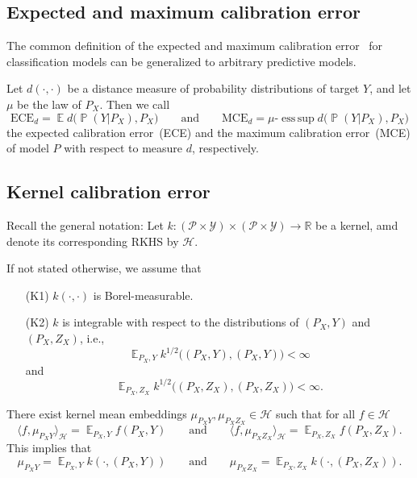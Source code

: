 \documentclass{article}
\DeclareMathOperator{\Prob}{\mathbb{P}}
\DeclareMathOperator{\Exp}{\mathbb{E}}
\DeclareMathOperator*{\esssup}{ess\,sup}
\begin{document}
\subsection{Expected and maximum calibration error}
\label{app:ece_mce}

The common definition of the expected and maximum calibration error~\citep{Naeini2015,Guo2017,Vaicenavicius2019,Kull2019}
for classification models can be generalized to arbitrary predictive
models.

\begin{definition}\label{def:ece_mce}
Let $d(\cdot, \cdot)$ be a distance measure of probability distributions
of target $Y$, and let $\mu$ be the law of $P_X$. Then we call
\begin{equation*}
    \mathrm{ECE}_d = \Exp d\big(\Prob(Y|P_X), P_X\big) \qquad \text{and} \qquad
    \mathrm{MCE}_d = \mu\text{-}\esssup d\big(\Prob(Y|P_X), P_X\big)
\end{equation*}
the expected calibration error~(ECE) and the maximum calibration error~(MCE)
of model $P$ with respect to measure $d$, respectively.
\end{definition}

\subsection{Kernel calibration error}

Recall the general notation: Let
$k \colon (\mathcal{P} \times \mathcal{Y}) \times (\mathcal{P} \times \mathcal{Y}) \to \mathbb{R}$
be a kernel, amd denote its corresponding RKHS by $\mathcal{H}$.

If not stated otherwise, we assume that
\begin{itemize}
    \item[(K1)] $k(\cdot, \cdot)$ is Borel-measurable.
    \item[(K2)] $k$ is integrable with respect to the distributions
    of $(P_X,Y)$ and $(P_X,Z_X)$, i.e.,
    \begin{equation*}
    \Exp_{P_X,Y} k^{1/2}\big((P_X, Y), (P_X, Y)\big) < \infty
    \end{equation*}
    and
    \begin{equation*}
    \Exp_{P_X,Z_X} k^{1/2}\big((P_X, Z_X), (P_X, Z_X)\big) < \infty.
    \end{equation*}
\end{itemize}

\begin{lemma}\label{lemma:mean_embedding}
There exist kernel mean embeddings
$\mu_{P_X Y}, \mu_{P_X Z_X} \in \mathcal{H}$
such that for all $f \in \mathcal{H}$
\begin{equation*}
    \langle f, \mu_{P_X Y} \rangle_{\mathcal{H}} = \Exp_{P_X,Y} f(P_X, Y) \qquad \text{and} \qquad    
    \langle f, \mu_{P_X Z_X} \rangle_{\mathcal{H}} = \Exp_{P_X,Z_X} f(P_X, Z_X).
\end{equation*}
This implies that
\begin{equation*}
    \mu_{P_X Y} = \Exp_{P_X,Y} k(\cdot, (P_X, Y)) \qquad \text{and} \qquad
    \mu_{P_X Z_X} = \Exp_{P_X,Z_X} k(\cdot, (P_X, Z_X)).
\end{equation*}
\end{lemma}
\end{document}
